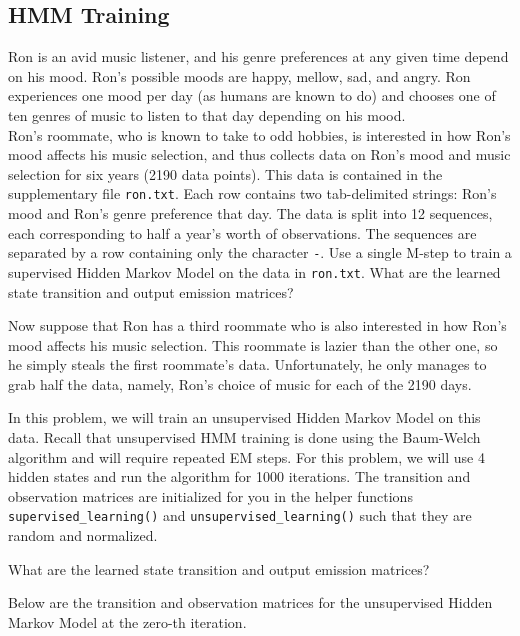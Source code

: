 \subsection{HMM Training}
Ron is an avid music listener, and his genre preferences at any given time depend on his mood. Ron's possible moods are happy, mellow, sad, and angry. Ron experiences one mood per day (as humans are known to do) and chooses one of ten genres of music to listen to that day depending on his mood. \\

Ron's roommate, who is known to take to odd hobbies, is interested in how Ron's mood affects his music selection, and thus collects data on Ron's mood and music selection for six years (2190 data points). This data is contained in the supplementary file \texttt{ron.txt}. Each row contains two tab-delimited strings: Ron's mood and Ron's genre preference that day. The data is split into 12 sequences, each corresponding to half a year's worth of observations. The sequences are separated by a row containing only the character \texttt{-}.
\noindent\problem[10] %
Use a single M-step to train a supervised Hidden Markov Model on the data in \texttt{ron.txt}. What are the learned state transition and output emission matrices?


\begin{solution}
\end{solution}
\indent\problem[15] %
Now suppose that Ron has a third roommate who is also interested in how Ron's mood affects his music selection. This roommate is lazier than the other one, so he simply steals the first roommate's data. Unfortunately, he only manages to grab half the data, namely, Ron's choice of music for each of the 2190 days.

In this problem, we will train an unsupervised Hidden Markov Model on this data. Recall that unsupervised HMM training is done using the Baum-Welch algorithm and will require repeated EM steps. For this problem, we will use 4 hidden states and run the algorithm for 1000 iterations. The transition and observation matrices are initialized for you in the helper functions \texttt{supervised\_learning()} and \texttt{unsupervised\_learning()} such that they are random and normalized.

What are the learned state transition and output emission matrices?

Below are the transition and observation matrices for the unsupervised Hidden Markov Model at the zero-th iteration.


